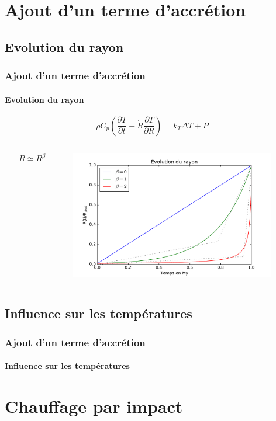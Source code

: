 \documentclass{beamer}
\begin{document}
\section{Ajout d'un terme d'accrétion}
\subsection{Evolution du rayon}

\begin{frame}
	\frametitle{Ajout d'un terme d'accrétion}
	\framesubtitle{Evolution du rayon}

		{\Large $$\rho C_p \left(\dfrac{\partial T}{\partial t} - \dot{R}\dfrac{\partial T}{\partial R}\right)  = k_{T} \Delta T  + P$$}
\begin{columns}
    \begin{column}{2cm}
      	{\huge $$\dot{R} \simeq R^\beta$$}
	\end{column}

	\begin{column}{9cm}
\center \includegraphics[width = 9cm]{figures/rayon.pdf}
	\end{column}
\end{columns}
\end{frame}

\subsection{Influence sur les températures}
\begin{frame}
	\frametitle{Ajout d'un terme d'accrétion}
	\framesubtitle{Influence sur les températures}
	

	
\end{frame}

\section{Chauffage par impact}
\end{document}
